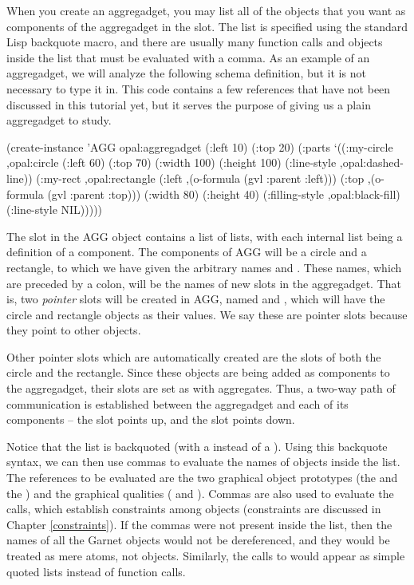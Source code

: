 When you create an aggregadget, you may list all of the objects that
you want as components of the aggregadget in the  slot.
The list is specified using the standard Lisp backquote macro, and
there are usually many function calls and objects inside the list that
must be evaluated with a comma.  As an example of an aggregadget, we
will analyze the following schema definition, but it is not necessary
to type it in.  This code contains a few references that have not been
discussed in this tutorial yet, but it serves the purpose of giving us
a plain aggregadget to study.

\begin{programexample}
(create-instance 'AGG opal:aggregadget
   (:left 10) (:top 20)
   (:parts
    `((:my-circle ,opal:circle
                  (:left 60) (:top 70)
                  (:width 100) (:height 100)
                  (:line-style ,opal:dashed-line))
      (:my-rect ,opal:rectangle
                (:left ,(o-formula (gvl :parent :left)))
                (:top ,(o-formula (gvl :parent :top)))
                (:width 80) (:height 40)
                (:filling-style ,opal:black-fill)
                (:line-style NIL)))))
\end{programexample}

The  slot in the AGG object contains
a list of lists, with each internal list being a definition of a component.
The components of AGG will be a circle and a rectangle, to which we
have given the arbitrary names  and .
These names, which are preceded by a colon, will be the names of new
slots in the aggregadget.  That is, two {\it pointer} slots will be
created in AGG, named  and , which will
have the circle and rectangle objects as their values.  We say these are
pointer slots because they point to other objects.

Other pointer slots which are automatically created are the
 slots of both the circle and the rectangle.  Since these
objects are being added as components to the aggregadget, their
 slots are set as with aggregates.  Thus, a two-way path
of communication is established between the aggregadget and each of
its components -- the  slot points up, and the
 slot points down.

Notice that the  list is backquoted
(with a  instead of a ).  Using this backquote syntax, we can then
use commas to evaluate the names of objects inside the list.  The
references to be evaluated are the two graphical object prototypes (the
 and the ) and the graphical
qualities ( and ).
Commas are also used to evaluate the  calls, which
establish constraints among objects (constraints are discussed
in Chapter \ref{constraints}).  If the commas were not present inside
the  list, then the names of all the Garnet objects would not be
dereferenced, and they would be treated as mere atoms, not objects.
Similarly, the calls to  would appear as simple quoted
lists instead of function calls.

